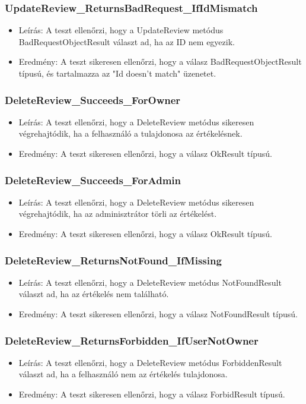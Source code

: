 \documentclass[11pt]{article}
\begin{document}
\subsubsection{UpdateReview\_ReturnsBadRequest\_IfIdMismatch}
\label{sec:orgf8593f8}
\begin{itemize}
\item Leírás: A teszt ellenőrzi, hogy a UpdateReview metódus BadRequestObjectResult választ ad, ha az ID nem egyezik.
\item Eredmény: A teszt sikeresen ellenőrzi, hogy a válasz BadRequestObjectResult típusú, és tartalmazza az "Id doesn't match" üzenetet.
\end{itemize}
\subsubsection{DeleteReview\_Succeeds\_ForOwner}
\label{sec:org4b6477e}
\begin{itemize}
\item Leírás: A teszt ellenőrzi, hogy a DeleteReview metódus sikeresen végrehajtódik, ha a felhasználó a tulajdonosa az értékelésnek.
\item Eredmény: A teszt sikeresen ellenőrzi, hogy a válasz OkResult típusú.
\end{itemize}
\subsubsection{DeleteReview\_Succeeds\_ForAdmin}
\label{sec:orgad4f672}
\begin{itemize}
\item Leírás: A teszt ellenőrzi, hogy a DeleteReview metódus sikeresen végrehajtódik, ha az adminisztrátor törli az értékelést.
\item Eredmény: A teszt sikeresen ellenőrzi, hogy a válasz OkResult típusú.
\end{itemize}
\subsubsection{DeleteReview\_ReturnsNotFound\_IfMissing}
\label{sec:org6c028ab}
\begin{itemize}
\item Leírás: A teszt ellenőrzi, hogy a DeleteReview metódus NotFoundResult választ ad, ha az értékelés nem található.
\item Eredmény: A teszt sikeresen ellenőrzi, hogy a válasz NotFoundResult típusú.
\end{itemize}
\subsubsection{DeleteReview\_ReturnsForbidden\_IfUserNotOwner}
\label{sec:orgf3ec829}
\begin{itemize}
\item Leírás: A teszt ellenőrzi, hogy a DeleteReview metódus ForbiddenResult választ ad, ha a felhasználó nem az értékelés tulajdonosa.
\item Eredmény: A teszt sikeresen ellenőrzi, hogy a válasz ForbidResult típusú.
\end{itemize}
\end{document}
